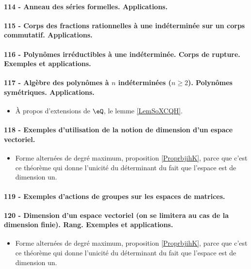 \paragraph{114 - Anneau des séries formelles. Applications.}
\paragraph{115 - Corps des fractions rationnelles à une indéterminée sur un corps commutatif. Applications.}
\paragraph{116 - Polynômes irréductibles à une indéterminée. Corps de rupture. Exemples et applications.}
\paragraph{117 - Algèbre des polynômes à \( n\) indéterminées (\( n\geq 2\)). Polynômes symétriques. Applications.}
\begin{itemize}
    \item À propos d'extensions de \( \eQ\), le lemme \ref{LemSoXCQH}.
\end{itemize}
\paragraph{118 - Exemples d’utilisation de la notion de dimension d’un espace vectoriel.}
\begin{itemize}
    \item Forme alternées de degré maximum, proposition \ref{ProprbjihK}, parce que c'est ce théorème qui donne l'unicité du déterminant du fait que l'espace est de dimension un.
\end{itemize}
\paragraph{119 - Exemples d’actions de groupes sur les espaces de matrices.}
\paragraph{120 - Dimension d’un espace vectoriel (on se limitera au cas de la dimension finie). Rang. Exemples et applications.}
\begin{itemize}
    \item Forme alternées de degré maximum, proposition \ref{ProprbjihK}, parce que c'est ce théorème qui donne l'unicité du déterminant du fait que l'espace est de dimension un.
\end{itemize}
